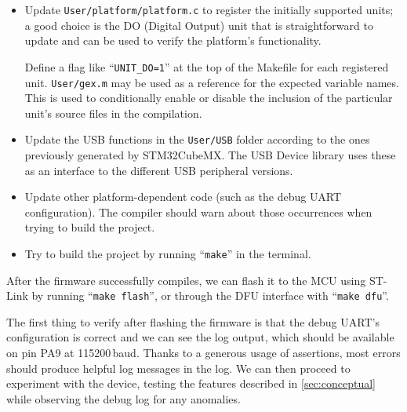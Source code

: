 \begin{itemize}
	\item Update \verb|User/platform/platform.c| to register the initially supported units; a good choice is the DO (Digital Output) unit that is straightforward to update and can be used to verify the platform's functionality.
	
	Define a flag like ``\verb|UNIT_DO=1|'' at the top of the Makefile for each registered unit. \verb|User/gex.m| may be used as a reference for the expected variable names. This is used to conditionally enable or disable the inclusion of the particular unit's source files in the compilation.
	
	\item Update the USB functions in the \verb|User/USB| folder according to the ones previously generated by STM32CubeMX. The USB Device library uses these as an interface to the different \gls{USB} peripheral versions.
	
	\item Update other platform-dependent code (such as the debug \gls{UART} configuration). The compiler should warn about those occurrences when trying to build the project.	
	
	\item Try to build the project by running ``\verb|make|'' in the terminal.
\end{itemize}

After the firmware successfully compiles, we can flash it to the \gls{MCU} using ST-Link by running ``\verb|make flash|'', or through the \gls{DFU} interface with ``\verb|make dfu|''. 

The first thing to verify after flashing the firmware is that the debug \gls{UART}'s configuration is correct and we can see the log output, which should be available on pin PA9 at 115200\,baud. Thanks to a generous usage of assertions, most errors should produce helpful log messages in the log. We can then proceed to experiment with the device, testing the features described in \cref{sec:conceptual} while observing the debug log for any anomalies.
